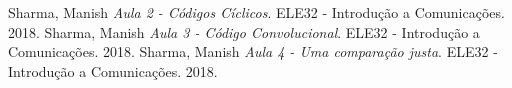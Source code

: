 \begin{thebibliography}{1}

Sharma, Manish \emph{Aula 2 - Códigos Cíclicos}. ELE32 - Introdução a Comunicações. 2018.
Sharma, Manish \emph{Aula 3 - Código Convolucional}. ELE32 - Introdução a Comunicações. 2018.
Sharma, Manish \emph{Aula 4 - Uma comparação justa}. ELE32 - Introdução a Comunicações. 2018.

\end{thebibliography}